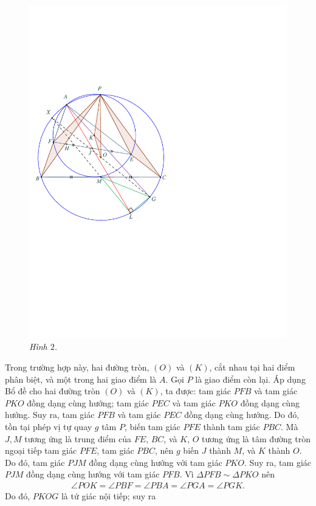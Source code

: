 \begin{multicols}{2}
\begin{figure}[H]
		\includegraphics[width= 0.85\linewidth]{P591H2}
		\caption{\small\textit{\color{thachthuctoanhoc}Hình $2$.}}
		\vspace*{-10pt}
	\end{figure}
	Trong trường hợp này, hai đường tròn, $(O)$ và $(K)$, cắt nhau tại hai điểm phân biệt, và một trong hai giao điểm là $A$. Gọi $P$ là giao điểm còn lại.
	\vskip 0.05cm
	Áp dụng Bổ đề cho hai đường tròn $(O)$ và $(K)$, ta được: tam giác $PFB$ và tam giác $PKO$ đồng dạng cùng hướng; tam giác $PEC$ và tam giác $PKO$ đồng dạng cùng hướng. Suy ra, tam giác $PFB$ và tam giác $PEC$ đồng dạng cùng hướng. Do đó, tồn tại phép vị tự quay $g$ tâm $P$, biến tam giác $PFE$ thành tam giác $PBC$. Mà $J, M$ tương ứng là trung điểm của $FE$, $BC$, và $K$, $O$ tương ứng là tâm đường tròn ngoại tiếp tam giác $PFE$, tam giác $PBC$, nên $g$ biến $J$ thành $M$, và $K$ thành $O$. Do đó, tam giác $PJM$ đồng dạng cùng hướng với tam giác $PKO$. Suy ra, tam giác $PJM$ đồng dạng cùng hướng với tam giác $PFB$.
	\vskip 0.05cm
	Vì $\Delta PFB \sim  \Delta PKO$ nên
	\begin{align*}
		\angle POK \!=\! \angle PBF \!=\! \angle PBA \!=\! \angle PGA \!=\! \angle PGK.
	\end{align*}
	Do đó, $PKOG$ là tứ giác nội tiếp; suy ra

\end{multicols}
